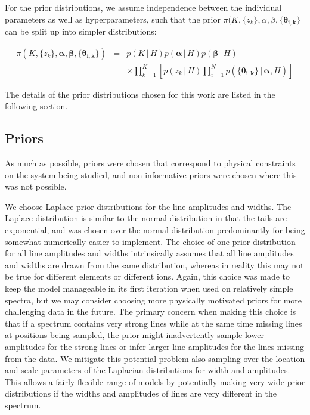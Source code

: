 \documentclass[12pt]{emulateapj}
\newcommand{\given}{\,|\,}
\newcommand{\pars}{\theta}
\begin{document}
For the prior distributions, we assume independence between the individual parameters as well as hyperparameters, such that the 
prior  $\pi(K, \{z_k\}, \alpha, \beta, \{\bm{\pars_{i,k}}\} $ can be split up into simpler distributions:

\begin{eqnarray}
\pi(K, \{z_k\}, \bm{\alpha}, \bm{\beta}, \{\bm{\pars_{i,k}}\} ) & = &  p(K \given H) p(\bm{\alpha} \given H) p(\bm{\beta} \given H)  \\	
					& & \times \prod_{k=1}^{K}{\left[p(z_k \given H) \prod_{i=1}^{N}{p( \{\bm{\pars_{i,k}}\} \given \bm{\alpha}, H)}\right]} \nonumber
\end{eqnarray}

The details of the prior distributions chosen for this work are listed in the following section.

\subsection{Priors}
\label{sec:priors}

As much as possible, priors were chosen that correspond to physical constraints on the system being studied, and non-informative priors were chosen where this was not possible. 

We choose Laplace prior distributions for the line amplitudes and widths. The Laplace distribution is similar to the normal distribution in that the tails are exponential, and was chosen over the normal distribution predominantly for being somewhat numerically easier to implement. The choice of one prior distribution for all line amplitudes and widths intrinsically assumes that all line amplitudes and widths are drawn from the same distribution, whereas in reality this may not be true for different elements or different ions. Again, this choice was made to keep the model manageable in its first iteration when used on relatively simple spectra, but we may consider choosing more physically motivated priors for more challenging data in the future.
The primary concern when making this choice is that if a spectrum contains very strong lines while at the same time missing lines at positions being sampled, the prior might inadvertently sample lower amplitudes for the strong lines or infer larger line amplitudes for the lines missing from the data.
We mitigate this potential problem also sampling over the location and scale parameters of the Laplacian distributions for width and amplitudes. This allows a fairly flexible range of models by potentially making very wide prior distributions if the widths and amplitudes of lines are very different in the spectrum.
\end{document}
